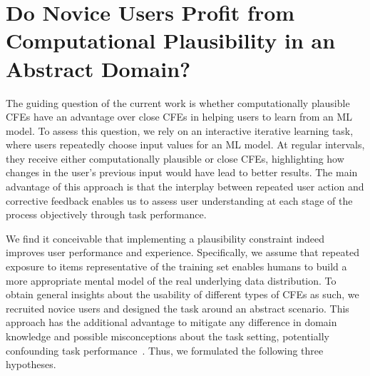 
\section{Do Novice Users Profit from Computational Plausibility in an Abstract Domain?}\label{sec:hypotheses}


The guiding question of the current work is whether computationally plausible \glspl{CFE} have an advantage over close \glspl{CFE} in helping users to learn from an \gls{ML} model.
To assess this question, we rely on an interactive iterative learning task, where users repeatedly choose input values for an \gls{ML} model.
At regular intervals, they receive either computationally plausible or close \glspl{CFE}, highlighting how changes in the user's previous input would have lead to better results.
The main advantage of this approach is that the interplay between repeated user action and corrective feedback enables us to assess user understanding at each stage of the process objectively through task performance.

We find it conceivable that implementing a plausibility constraint indeed improves user performance and experience. 
Specifically, we assume that repeated exposure to items representative of the training set enables humans to build a more appropriate mental model of the real underlying data distribution.
To obtain general insights about the usability of different types of \glspl{CFE} as such, we recruited novice users and designed the task around an abstract scenario.
This approach has the additional advantage to mitigate any difference in domain knowledge and possible misconceptions about the task setting, potentially confounding task performance~\citep{van_der_waa_evaluating_2021}.
Thus, we formulated the following three hypotheses.

